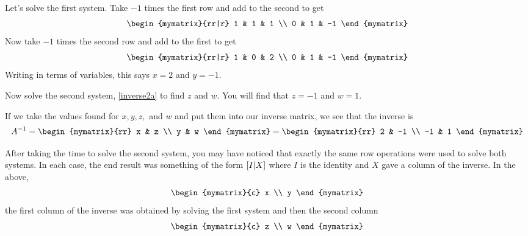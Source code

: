 Let's solve the first system. Take $-1$ times
the first row and add to the second to get
\begin{equation*}
\begin{mymatrix}{rr|r}
1 & 1 & 1 \\
0 & 1 & -1
\end{mymatrix}
\end{equation*}
Now take $-1$ times the second row and add to the first to
get
\begin{equation*}
\begin{mymatrix}{rr|r}
1 & 0 & 2 \\
0 & 1 & -1
\end{mymatrix} 
\end{equation*}
Writing in terms of variables, this says $x=2$ and $y=-1.$

Now solve the second system, \ref{inverse2a} to find $z$ and $w.$ You will find that 
$z = -1$ and $w = 1$.

If we take the values found for $x,y,z,$ and $w$
 and put them into our inverse matrix, we see that the inverse
is
\begin{equation*}
A^{-1} = 
\begin{mymatrix}{rr}
x & z \\
y & w
\end{mymatrix}
=
\begin{mymatrix}{rr}
2 & -1 \\
-1 & 1
\end{mymatrix} 
\end{equation*}

After taking the time to solve the second system, you may have noticed that exactly the same row
operations were used to solve both systems. In each case, the end result was
something of the form $\left[I|X\right] $ where $I$ is the
identity and $X$ gave a column of the inverse. In the above, 
\begin{equation*}
\begin{mymatrix}{c}
x \\
y
\end{mymatrix}
\end{equation*}
 the first column of the inverse was obtained by solving the first system and then the
second column 
\begin{equation*}
\begin{mymatrix}{c}
z \\
w
\end{mymatrix} 
\end{equation*}

